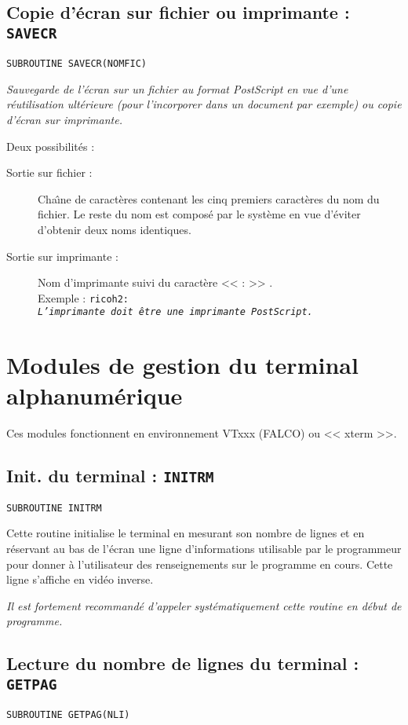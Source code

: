 \documentclass[a4paper,12pt,titlepage]{article}
\newcommand{\darg}[1]{\item[\tt #1\rm]}
\newcommand{\fsub}[1]{\hbox {\tt SUBROUTINE #1  } \medskip }
\newenvironment{argdesc}{\begin{list}{-}{\leftmargin 8em \labelwidth 7em}}%
{\end{list}}
\begin{document}
\subsection{Copie d'\'ecran sur fichier ou imprimante : \tt SAVECR}
\fsub{SAVECR(NOMFIC)}

    \em Sauvegarde de l'\'ecran sur un fichier au format PostScript en vue
d'une r\'eutilisation ult\'e\-rieure (pour l'incorporer dans un document par
exemple) ou copie d'\'ecran sur imprimante.\em
\begin{argdesc}
    \darg{NOMFIC :} Deux possibilit\'es :
       \begin{description}
          \item[Sortie sur fichier : ] Cha\^{\i}ne de caract\`eres contenant
les cinq premiers caract\`eres du nom du fichier. Le reste du nom est
compos\'e par le syst\`eme en vue d'\'eviter d'obtenir deux noms identiques.
          \item[Sortie sur imprimante : ] Nom d'imprimante suivi du
caract\`ere << : >> .\\
Exemple  : \tt ricoh2:\rm\\
 \em L'imprimante doit \^etre une
imprimante PostScript.\em
       \end{description}
\end{argdesc}


\section{Modules de gestion du terminal alphanum\'erique}

   Ces modules fonctionnent en environnement VTxxx (FALCO) ou << xterm >>.

\subsection{Init. du terminal : \tt INITRM}
\fsub{INITRM}

Cette routine initialise le terminal en mesurant son nombre de lignes et en
r\'eservant au bas de l'\'ecran une ligne d'informations utilisable par le
programmeur pour donner \`a l'utilisateur des renseignements sur le
programme en cours. Cette ligne s'affiche en vid\'eo inverse.

\em Il est fortement recommand\'e d'appeler syst\'ematiquement cette routine
en d\'ebut de programme.\em

\subsection{Lecture du nombre de lignes du terminal : \tt GETPAG}
\fsub{GETPAG(NLI)}
\end{document}
